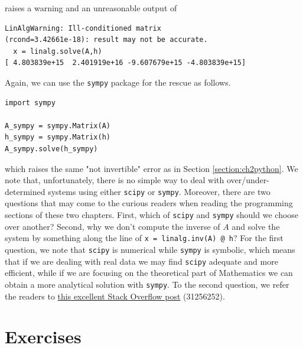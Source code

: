 raises a warning and an unreasonable output of
\begin{lstlisting}
LinAlgWarning: Ill-conditioned matrix 
(rcond=3.42661e-18): result may not be accurate.
  x = linalg.solve(A,h)
[ 4.803839e+15  2.401919e+16 -9.607679e+15 -4.803839e+15]   
\end{lstlisting}
Again, we can use the \verb|sympy| package for the rescue as follows.
\begin{lstlisting}
import sympy

A_sympy = sympy.Matrix(A)
h_sympy = sympy.Matrix(h)
A_sympy.solve(h_sympy)
\end{lstlisting}
which raises the same "not invertible" error as in Section \ref{section:ch2python}. We note that, unfortunately, there is no simple way to deal with over/under-determined systems using either \verb|scipy| or \verb|sympy|. Moreover, there are two questions that may come to the curious readers when reading the programming sections of these two chapters. First, which of \verb|scipy| and \verb|sympy| should we choose over another? Second, why we don't compute the inverse of $A$ and solve the system by something along the line of \verb|x = linalg.inv(A) @ h|? For the first question, we note that \verb|scipy| is numerical while \verb|sympy| is symbolic, which means that if we are dealing with real data we may find \verb|scipy| adequate and more efficient, while if we are focusing on the theoretical part of Mathematics we can obtain a more analytical solution with \verb|sympy|. To the second question, we refer the readers to \href{https://stackoverflow.com/questions/31256252/why-does-numpy-linalg-solve-offer-more-precise-matrix-inversions-than-numpy-li}{this excellent Stack Overflow post} (31256252).
\section{Exercises}

